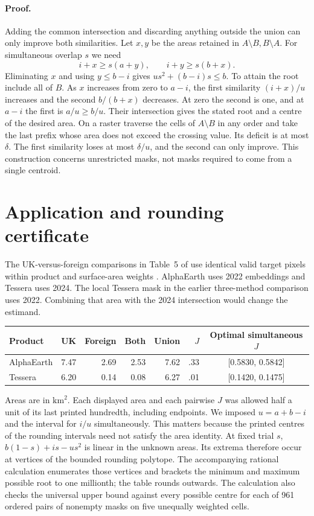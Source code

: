 \documentclass[11pt]{article}
\begin{document}
\paragraph{Proof.} Adding the common intersection and discarding anything outside the union can only improve both similarities. Let $x,y$ be the areas retained in $A\setminus B,B\setminus A$. For simultaneous overlap $s$ we need
\[
 i+x\ge s(a+y),\qquad i+y\ge s(b+x).
\]
Eliminating $x$ and using $y\le b-i$ gives $u s^2+(b-i)s\le b$. To attain the root include all of $B$. As $x$ increases from zero to $a-i$, the first similarity $(i+x)/u$ increases and the second $b/(b+x)$ decreases. At zero the second is one, and at $a-i$ the first is $a/u\ge b/u$. Their intersection gives the stated root and a centre of the desired area. On a raster traverse the cells of $A\setminus B$ in any order and take the last prefix whose area does not exceed the crossing value. Its deficit is at most $\delta$. The first similarity loses at most $\delta/u$, and the second can only improve. This construction concerns unrestricted masks, not masks required to come from a single centroid.

\section{Application and rounding certificate}
The UK-versus-foreign comparisons in Table~5 of \cite{soil} use identical valid target pixels within product and surface-area weights \cite{code}. AlphaEarth uses 2022 embeddings and Tessera uses 2024. The local Tessera mask in the earlier three-method comparison uses 2022. Combining that area with the 2024 intersection would change the estimand.

\begin{center}
\begin{tabular}{lrrrrrc}\toprule
Product & UK & Foreign & Both & Union & $J$ & Optimal simultaneous $J$\\\midrule
AlphaEarth &7.47&2.69&2.53&7.62&.33&[0.5830, 0.5842]\\
Tessera    &6.20&0.14&0.08&6.27&.01&[0.1420, 0.1475]\\\bottomrule
\end{tabular}
\end{center}
Areas are in $\mathrm{km}^2$. Each displayed area and each pairwise $J$ was allowed half a unit of its last printed hundredth, including endpoints. We imposed $u=a+b-i$ and the interval for $i/u$ simultaneously. This matters because the printed centres of the rounding intervals need not satisfy the area identity. At fixed trial $s$, $b(1-s)+is-us^2$ is linear in the unknown areas. Its extrema therefore occur at vertices of the bounded rounding polytope. The accompanying rational calculation enumerates those vertices and brackets the minimum and maximum possible root to one millionth; the table rounds outwards. The calculation also checks the universal upper bound against every possible centre for each of 961 ordered pairs of nonempty masks on five unequally weighted cells.
\end{document}
